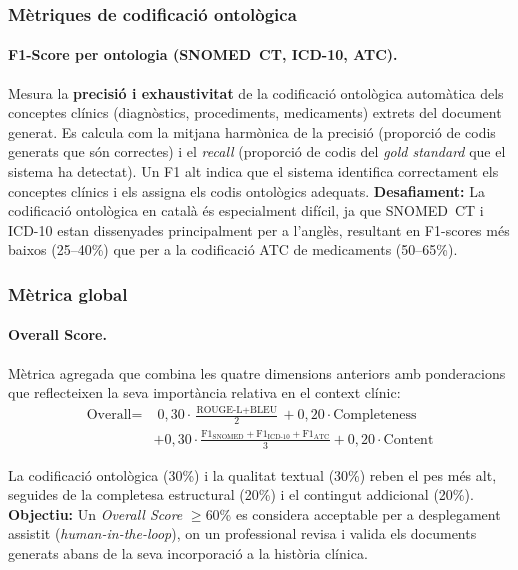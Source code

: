 \documentclass[CAT]{TFUOC}%
\begin{document}
\subsubsection{Mètriques de codificació ontològica}

\paragraph{F1-Score per ontologia (SNOMED~CT, ICD-10, ATC).}
Mesura la \textbf{precisió i exhaustivitat} de la codificació ontològica automàtica dels conceptes clínics (diagnòstics, procediments, medicaments) extrets del document generat. Es calcula com la mitjana harmònica de la precisió (proporció de codis generats que són correctes) i el \textit{recall} (proporció de codis del \textit{gold standard} que el sistema ha detectat). Un F1 alt indica que el sistema identifica correctament els conceptes clínics i els assigna els codis ontològics adequats. \textbf{Desafiament:} La codificació ontològica en català és especialment difícil, ja que SNOMED~CT i ICD-10 estan dissenyades principalment per a l'anglès, resultant en F1-scores més baixos (25--40\%) que per a la codificació ATC de medicaments (50--65\%).

\subsubsection{Mètrica global}

\paragraph{Overall Score.}
Mètrica agregada que combina les quatre dimensions anteriors amb ponderacions que reflecteixen la seva importància relativa en el context clínic:
\begin{equation*}
\begin{split}
\text{Overall} = & \; 0{,}30 \cdot \frac{\text{ROUGE-L}+\text{BLEU}}{2} + 0{,}20 \cdot \text{Completeness} \\
& + 0{,}30 \cdot \frac{\text{F1}_\text{SNOMED}+\text{F1}_\text{ICD-10}+\text{F1}_\text{ATC}}{3} + 0{,}20 \cdot \text{Content}
\end{split}
\end{equation*}

La codificació ontològica (30\%) i la qualitat textual (30\%) reben el pes més alt, seguides de la completesa estructural (20\%) i el contingut addicional (20\%). \textbf{Objectiu:} Un \textit{Overall Score} $\geq$60\% es considera acceptable per a desplegament assistit (\textit{human-in-the-loop}), on un professional revisa i valida els documents generats abans de la seva incorporació a la història clínica.
\end{document}

